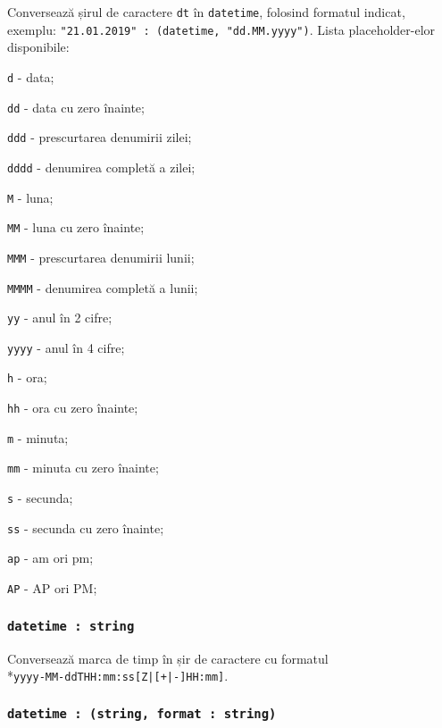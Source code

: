 Conversează șirul de caractere \texttt{dt} în \texttt{datetime}, folosind formatul indicat, exemplu: \texttt{"21.01.2019" : (datetime, "dd.MM.yyyy")}. Lista placeholder-elor disponibile:
\begin{icItems}
	\item \texttt{d} - data;
	\item \texttt{dd} - data cu zero înainte;
	\item \texttt{ddd} - prescurtarea denumirii zilei;
	\item \texttt{dddd} - denumirea completă a zilei;
	\item \texttt{M} - luna;
	\item \texttt{MM} - luna cu zero înainte;
	\item \texttt{MMM} - prescurtarea denumirii lunii;
	\item \texttt{MMMM} - denumirea completă a lunii;
	\item \texttt{yy} - anul în 2 cifre;
	\item \texttt{yyyy} - anul în 4 cifre;
	\item \texttt{h} - ora;
	\item \texttt{hh} - ora cu zero înainte;
	\item \texttt{m} - minuta;
	\item \texttt{mm} - minuta cu zero înainte;
	\item \texttt{s} - secunda;
	\item \texttt{ss} - secunda cu zero înainte;
	\item \texttt{ap} - am ori pm;
	\item \texttt{AP} - AP ori PM;
\end{icItems}

\subsubsection{\texttt{datetime : string}}

Conversează marca de timp în șir de caractere cu formatul \\*\texttt{yyyy-MM-ddTHH:mm:ss[Z|[+|-]HH:mm]}.

\subsubsection{\texttt{datetime : (string, format : string)}}

